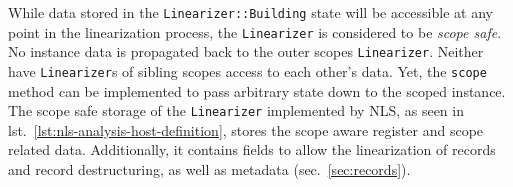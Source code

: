 \documentclass[
  a4paper,
  bibtex,
  english,
  nomenclature]{kthlatex/kththesis/kththesis}
\begin{document}
While data stored in the \texttt{Linearizer::Building} state will be
accessible at any point in the linearization process, the
\texttt{Linearizer} is considered to be \emph{scope safe}. No instance
data is propagated back to the outer scopes \texttt{Linearizer}. Neither
have \texttt{Linearizer}s of sibling scopes access to each other's data.
Yet, the \texttt{scope} method can be implemented to pass arbitrary
state down to the scoped instance. The scope safe storage of the
\texttt{Linearizer} implemented by NLS, as seen in
lst.~\ref{lst:nls-analysis-host-definition}, stores the scope aware
register and scope related data. Additionally, it contains fields to
allow the linearization of records and record destructuring, as well as
metadata (sec.~\ref{sec:records}).

\begin{codelisting}

\caption{Definition of the AnalysisHost}


\end{codelisting}
\end{document}
